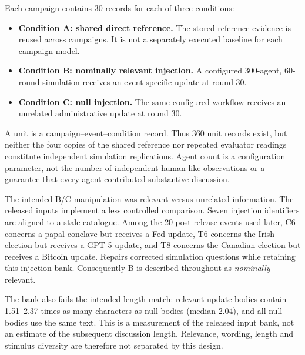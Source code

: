 \documentclass[10pt,conference]{IEEEtran}
\begin{document}
Each campaign contains 30 records for each of three conditions:
\begin{itemize}
\item \textbf{Condition A: shared direct reference.} The stored reference evidence
is reused across campaigns. It is not a separately executed baseline for each
campaign model.
\item \textbf{Condition B: nominally relevant injection.} A configured
300-agent, 60-round simulation receives an event-specific update at round 30.
\item \textbf{Condition C: null injection.} The same configured workflow receives
an unrelated administrative update at round 30.
\end{itemize}
A unit is a campaign--event--condition record. Thus 360 unit records exist,
but neither the four copies of the shared reference nor repeated evaluator
readings constitute independent simulation replications. Agent count is a
configuration parameter, not the number of independent human-like observations
or a guarantee that every agent contributed substantive discussion.

The intended B/C manipulation was relevant versus unrelated information.
The released inputs implement a less controlled comparison. Seven injection
identifiers are aligned to a stale catalogue. Among the 20 post-release events
used later, C6 concerns a papal conclave but receives a Fed update, T6 concerns
the Irish election but receives a GPT-5 update, and T8 concerns the Canadian
election but receives a Bitcoin update. Repairs corrected simulation questions
while retaining this injection bank. Consequently B is described throughout
as \emph{nominally} relevant.

The bank also fails the intended length match: relevant-update bodies contain
1.51--2.37 times as many characters as null bodies (median 2.04), and all null
bodies use the same text. This is a measurement of the released input bank,
not an estimate of the subsequent discussion length. Relevance, wording,
length and stimulus diversity are therefore not separated by this design.
\end{document}
